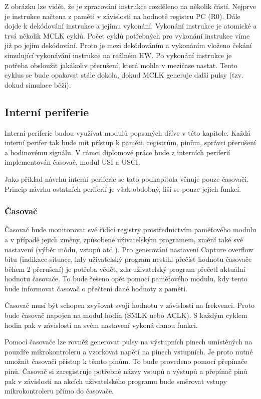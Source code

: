 Z obrázku lze vidět, že je zpracování instrukce rozděleno na několik částí. Nejprve je instrukce načtena z paměti v závislosti na hodnotě registru PC (R0).
Dále dojde k dekódování instrukce a jejímu vykonání. Vykonání instrukce je atomické a trvá několik MCLK cyklů. Počet cyklů potřebných pro vykonání
instrukce víme již po jejím dekódování. Proto je mezi dekódováním a vykonáním vloženo čekání simulující vykonávání instrukce na reálném HW.
Po vykonání instrukce je potřeba obsloužit jakákoliv přerušení, která mohla v mezičase nastat. Tento cyklus se bude opakovat stále dokola, dokud MCLK generuje další pulsy (tzv. dokud simulace běží).

\subsection{Interní periferie}

Interní periferie budou využívat modulů popsaných dříve v této kapitole. Každá interní perifer tak bude mít přístup k paměti, registrům, pinům, správci
přerušení a hodinovému signálu. V rámci diplomové práce bude z interních periferií implementován časovač, modul USI a USCI.

Jako příklad návrhu interní periferie se tato podkapitola věnuje pouze časovači. Princip návrhu ostatních periferií je však obdobný, liší se pouze jejich funkcí.

\subsubsection{Časovač}

Časovač bude monitorovat své řídící registry prostřednictvím paměťového modulu a v případě jejich změny, způsobené uživatelským programem, změní také své nastavení (výběr módu, vstupů atd.). Pro generování nastavení Capture overflow bitu (indikace situace, kdy uživatelský program nestihl přečíst hodnotu časovače během 2 přerušení) je potřeba vědět, zda uživatelský program přečetl aktuální hodnotu časovače. To bude řešeno opět pomocí paměťového modulu, kdy tento bude informovat časovač o přečtení dané hodnoty z paměti.

Časovač musí být schopen zvyšovat svoji hodnotu v závislosti na frekvenci. Proto bude časovač napojen na modul hodin (SMLK nebo ACLK). S každým cyklem
hodin pak v závislosti na svém nastavení vykoná danou funkci.

Pomocí časovače lze rovněž generovat pulsy na výstupních pinech umístěných na pouzdře mikrokontroleru a vzorkovat napětí na pinech vstupních.
Je proto nutné umožnit časovači přístup k těmto pinům. To bude provedeno pomocí přepínače pinů. Časovač si zaregistruje potřebné názvy vstupů a výstupů
a přepínač pinů pak v závislosti na akcích uživatelského programu bude směrovat vstupy mikrokontroleru přímo do časovače.

